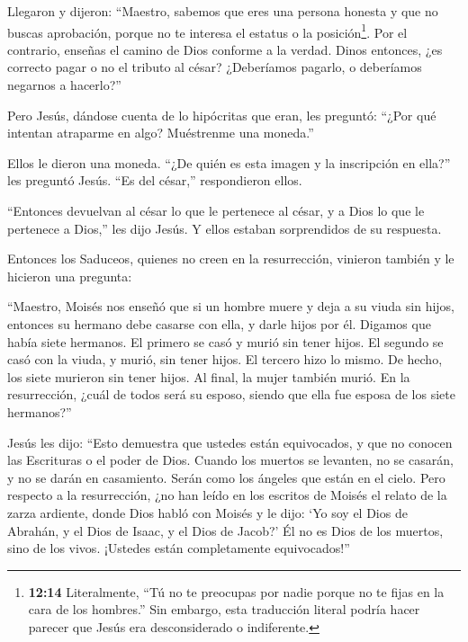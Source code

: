  Llegaron y dijeron: ``Maestro, sabemos que eres una
persona honesta y que no buscas aprobación, porque no te interesa el
estatus o la posición\footnote{\textbf{12:14} Literalmente, ``Tú no te
  preocupas por nadie porque no te fijas en la cara de los hombres.''
  Sin embargo, esta traducción literal podría hacer parecer que Jesús
  era desconsiderado o indiferente.}. Por el contrario, enseñas el
camino de Dios conforme a la verdad. Dinos entonces, ¿es correcto pagar
o no el tributo al césar?  ¿Deberíamos pagarlo, o
deberíamos negarnos a hacerlo?''

Pero Jesús, dándose cuenta de lo hipócritas que eran, les preguntó:
``¿Por qué intentan atraparme en algo? Muéstrenme una moneda.''

 Ellos le dieron una moneda. ``¿De quién es esta imagen y
la inscripción en ella?'' les preguntó Jesús. ``Es del césar,''
respondieron ellos.

 ``Entonces devuelvan al césar lo que le pertenece al
césar, y a Dios lo que le pertenece a Dios,'' les dijo Jesús. Y ellos
estaban sorprendidos de su respuesta.

 Entonces los Saduceos, quienes no creen en la
resurrección, vinieron también y le hicieron una pregunta:

 ``Maestro, Moisés nos enseñó que si un hombre muere y deja
a su viuda sin hijos, entonces su hermano debe casarse con ella, y darle
hijos por él.  Digamos que había siete hermanos. El primero
se casó y murió sin tener hijos.  El segundo se casó con la
viuda, y murió, sin tener hijos. El tercero hizo lo mismo. 
De hecho, los siete murieron sin tener hijos. Al final, la mujer también
murió.  En la resurrección, ¿cuál de todos será su esposo,
siendo que ella fue esposa de los siete hermanos?''

 Jesús les dijo: ``Esto demuestra que ustedes están
equivocados, y que no conocen las Escrituras o el poder de Dios.
 Cuando los muertos se levanten, no se casarán, y no se
darán en casamiento. Serán como los ángeles que están en el cielo.
 Pero respecto a la resurrección, ¿no han leído en los
escritos de Moisés el relato de la zarza ardiente, donde Dios habló con
Moisés y le dijo: `Yo soy el Dios de Abrahán, y el Dios de Isaac, y el
Dios de Jacob?'  Él no es Dios de los muertos, sino de los
vivos. ¡Ustedes están completamente equivocados!''

